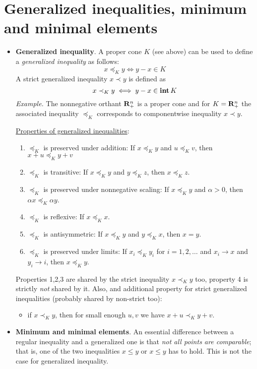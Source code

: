 \documentclass[a4paper, oneside]{book}
\begin{document}
\section{Generalized inequalities, minimum and minimal elements}
\begin{itemize}
\item \textbf{Generalized inequality}. A proper cone $K$ (see above) can be used to define a \textit{generalized inequality} as follows:
$$x\preceq_K y \iff y-x \in K$$
A strict generalized inequality $x \prec y$ is defined as
$$x \prec_K y \iff y-x \in \textbf{int}\,K$$
%
\textit{Example.} The nonnegative orthant $\mathbf R_+^n$ is a proper cone and for $K = \mathbf R_+^n$ the associated inequality $\preceq_K$  corresponds to componentwise inequality $x\prec y$.

\underline{Properties of generalized inequalities}:
	\begin{enumerate}
	\item $\preceq_K$ is preserved under addition: If $x \preceq_K y$ and $u \preceq_K v$, then $x+u \preceq_K y+v$
	\item $\preceq_K$ is transitive: If $x \preceq_K y$ and $y \preceq_K z$, then $x \preceq_K z$.
	\item $\preceq_K$ is preserved under nonnegative scaling: If $x\preceq_K y$ and $\alpha > 0$, then $\alpha  x \preceq_K \alpha y$.
	\item $\preceq_K$ is reflexive: If $x \preceq_K x$.
	\item $\preceq_K$ is antisymmetric: If $x \preceq_K y$ and $y \preceq_K x$, then $x = y$.
	\item $\preceq_K$ is preserved under limits: If $x_i \preceq_K y_i$ for $i=1,2,\hdots$ and $x_i \to x$ and $y_i \to i$, then $x \preceq_K y$. 
	\end{enumerate}
	
Properties 1,2,3 are shared by the strict inequality $x \prec_K y$ too, property 4 is strictly \textit{not} shared by it. Also, and additional property for strict generalized inequalities (probably shared by non-strict too):
	\begin{itemize}
	\item if $x\prec_K y$, then for small enough $u,v$ we have $x+u\prec_K y+v$.
	\end{itemize}
\item \textbf{Minimum and minimal elements}. An essential difference between a regular inequality and a generalized one is that \textit{not all points are comparable}; that is, one of the two inequalities $x \le y$ or $x \le y$ has to hold. This is not the case for generalized inequality.


\end{itemize}
\end{document}
